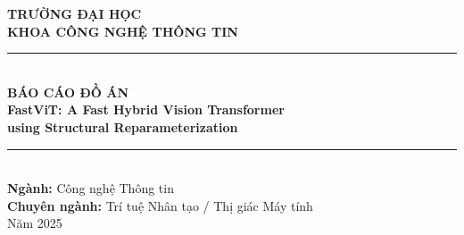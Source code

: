 \documentclass[12pt, a4paper]{report}
\begin{document}
\begin{titlepage}
\begin{center}

\vspace*{1cm}
{\Large\textbf{TRƯỜNG ĐẠI HỌC}}\\[0.3cm]
{\Large\textbf{KHOA CÔNG NGHỆ THÔNG TIN}}\\[2cm]

\rule{\linewidth}{0.5mm}\\[0.5cm]
{\LARGE\textbf{BÁO CÁO ĐỒ ÁN}}\\[0.3cm]
{\Huge\textbf{FastViT: A Fast Hybrid Vision Transformer\\using Structural Reparameterization}}\\[0.3cm]
\rule{\linewidth}{0.5mm}\\[2cm]

{\large\textbf{Ngành:} Công nghệ Thông tin}\\[0.3cm]
{\large\textbf{Chuyên ngành:} Trí tuệ Nhân tạo / Thị giác Máy tính}\\[2cm]

\vfill
{\large Năm 2025}

\end{center}
\end{titlepage}

\tableofcontents
\newpage

\listoffigures
\newpage

\listoftables
\newpage







\end{document}
